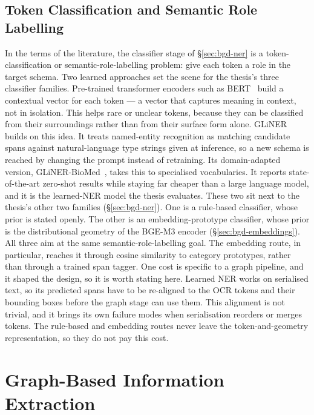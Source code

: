 \subsection{Token Classification and Semantic Role Labelling}\label{sec:rw-classification}

In the terms of the literature, the classifier stage of \S\ref{sec:bgd-ner} is a token-classification or semantic-role-labelling problem: give each token a role in the target schema. Two learned approaches set the scene for the thesis's three classifier families. Pre-trained transformer encoders such as BERT~\cite{devlin2019bert} build a contextual vector for each token --- a vector that captures meaning in context, not in isolation. This helps rare or unclear tokens, because they can be classified from their surroundings rather than from their surface form alone. GLiNER~\cite{zaratiana2023gliner} builds on this idea. It treats named-entity recognition as matching candidate spans against natural-language type strings given at inference, so a new schema is reached by changing the prompt instead of retraining. Its domain-adapted version, GLiNER-BioMed~\cite{yazdani2025glinerbiomed}, takes this to specialised vocabularies. It reports state-of-the-art zero-shot results while staying far cheaper than a large language model, and it is the learned-NER model the thesis evaluates. These two sit next to the thesis's other two families (\S\ref{sec:bgd-ner}). One is a rule-based classifier, whose prior is stated openly. The other is an embedding-prototype classifier, whose prior is the distributional geometry of the BGE-M3 encoder (\S\ref{sec:bgd-embeddings}). All three aim at the same semantic-role-labelling goal. The embedding route, in particular, reaches it through cosine similarity to category prototypes, rather than through a trained span tagger. One cost is specific to a graph pipeline, and it shaped the design, so it is worth stating here. Learned NER works on serialised text, so its predicted spans have to be re-aligned to the OCR tokens and their bounding boxes before the graph stage can use them. This alignment is not trivial, and it brings its own failure modes when serialisation reorders or merges tokens. The rule-based and embedding routes never leave the token-and-geometry representation, so they do not pay this cost.

\section{Graph-Based Information Extraction}\label{sec:rw-graph-ie}

